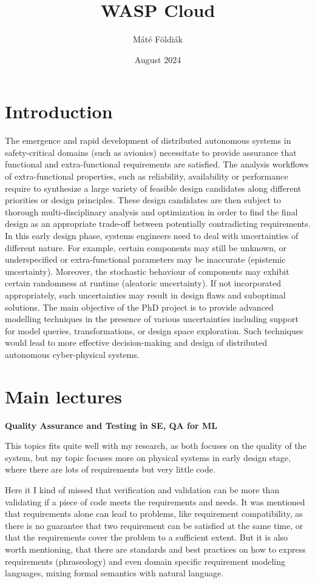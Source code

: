 \documentclass{article}
\title{WASP Cloud}
\author{Máté Földiák}
\date{August 2024}
\begin{document}
\maketitle

\section{Introduction}
The emergence and rapid development of distributed autonomous systems in safety-critical domains (such as avionics) necessitate to provide assurance that functional and extra-functional requirements are satisfied. The analysis workflows of extra-functional properties, such as reliability, availability or performance require to synthesize a large variety of feasible design candidates along different priorities or design principles. These design candidates are then subject to thorough multi-disciplinary analysis and optimization in order to find the final design as an appropriate trade-off between potentially contradicting requirements. 
In this early design phase, systems engineers need to deal with uncertainties of different nature. For example, certain components may still be unknown, or underspecified or extra-functional parameters may be inaccurate (epistemic uncertainty). Moreover, the stochastic behaviour of components may exhibit certain randomness at runtime (aleatoric uncertainty). If not incorporated appropriately, such uncertainties may result in design flaws and suboptimal solutions.
The main objective of the PhD project is to provide advanced modelling techniques in the presence of various uncertainties including support for model queries, transformations, or design space exploration. Such techniques would lead to more effective decision-making and design of distributed autonomous cyber-physical systems.

\section{Main lectures} 
\textbf{Quality Assurance and Testing in SE, QA for ML}

\noindent
This topics fits quite well with my research, as both focuses on the quality of the system, but my topic focuses more on physical systems in early design stage, where there are lots of requirements but very little code.

Here it I kind of missed that verification and validation can be more than validating if a piece of code meets the requirements and needs. 
It was mentioned that requirements alone can lead to problems, like requirement compatibility, as there is no guarantee that two requirement can be satisfied at the same time, or that the requirements cover the problem to a sufficient extent.
But it is also worth mentioning, that there are standards and best practices on how to express requirements (phraseology) and even domain specific requirement modeling languages, mixing formal semantics with natural language.
\end{document}
